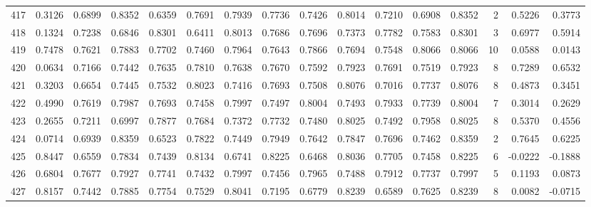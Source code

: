 \begin{tabular}{lrrrrrrrrrrrrrrr}
417 &      0.3126 &  0.6899 &  0.8352 &  0.6359 &  0.7691 &  0.7939 &  0.7736 &  0.7426 &  0.8014 &  0.7210 &   0.6908 &     0.8352 &      2 &                    0.5226 &                     0.3773 \\
418 &      0.1324 &  0.7238 &  0.6846 &  0.8301 &  0.6411 &  0.8013 &  0.7686 &  0.7696 &  0.7373 &  0.7782 &   0.7583 &     0.8301 &      3 &                    0.6977 &                     0.5914 \\
419 &      0.7478 &  0.7621 &  0.7883 &  0.7702 &  0.7460 &  0.7964 &  0.7643 &  0.7866 &  0.7694 &  0.7548 &   0.8066 &     0.8066 &     10 &                    0.0588 &                     0.0143 \\
420 &      0.0634 &  0.7166 &  0.7442 &  0.7635 &  0.7810 &  0.7638 &  0.7670 &  0.7592 &  0.7923 &  0.7691 &   0.7519 &     0.7923 &      8 &                    0.7289 &                     0.6532 \\
421 &      0.3203 &  0.6654 &  0.7445 &  0.7532 &  0.8023 &  0.7416 &  0.7693 &  0.7508 &  0.8076 &  0.7016 &   0.7737 &     0.8076 &      8 &                    0.4873 &                     0.3451 \\
422 &      0.4990 &  0.7619 &  0.7987 &  0.7693 &  0.7458 &  0.7997 &  0.7497 &  0.8004 &  0.7493 &  0.7933 &   0.7739 &     0.8004 &      7 &                    0.3014 &                     0.2629 \\
423 &      0.2655 &  0.7211 &  0.6997 &  0.7877 &  0.7684 &  0.7372 &  0.7732 &  0.7480 &  0.8025 &  0.7492 &   0.7958 &     0.8025 &      8 &                    0.5370 &                     0.4556 \\
424 &      0.0714 &  0.6939 &  0.8359 &  0.6523 &  0.7822 &  0.7449 &  0.7949 &  0.7642 &  0.7847 &  0.7696 &   0.7462 &     0.8359 &      2 &                    0.7645 &                     0.6225 \\
425 &      0.8447 &  0.6559 &  0.7834 &  0.7439 &  0.8134 &  0.6741 &  0.8225 &  0.6468 &  0.8036 &  0.7705 &   0.7458 &     0.8225 &      6 &                   -0.0222 &                    -0.1888 \\
426 &      0.6804 &  0.7677 &  0.7927 &  0.7741 &  0.7432 &  0.7997 &  0.7456 &  0.7965 &  0.7488 &  0.7912 &   0.7737 &     0.7997 &      5 &                    0.1193 &                     0.0873 \\
427 &      0.8157 &  0.7442 &  0.7885 &  0.7754 &  0.7529 &  0.8041 &  0.7195 &  0.6779 &  0.8239 &  0.6589 &   0.7625 &     0.8239 &      8 &                    0.0082 &                    -0.0715 \\

\end{tabular}
